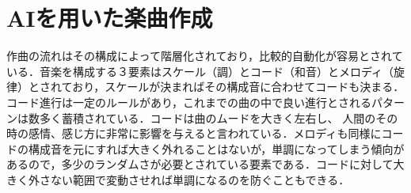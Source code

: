 \section{AIを用いた楽曲作成}
作曲の流れはその構成によって階層化されており，比較的自動化が容易とされている．音楽を構成する３要素はスケール（調）とコード（和音）とメロディ（旋律）とされており，スケールが決まればその構成音に合わせてコードも決まる．コード進行は一定のルールがあり，これまでの曲の中で良い進行とされるパターンは数多く蓄積されている．コードは曲のムードを大きく左右し、
人間のその時の感情、感じ方に非常に影響を与えると言われている．メロディも同様にコードの構成音を元にすれば大きく外れることはないが，単調になってしまう傾向があるので，多少のランダムさが必要とされている要素である．コードに対して大きく外さない範囲で変動させれば単調になるのを防ぐこともできる．
